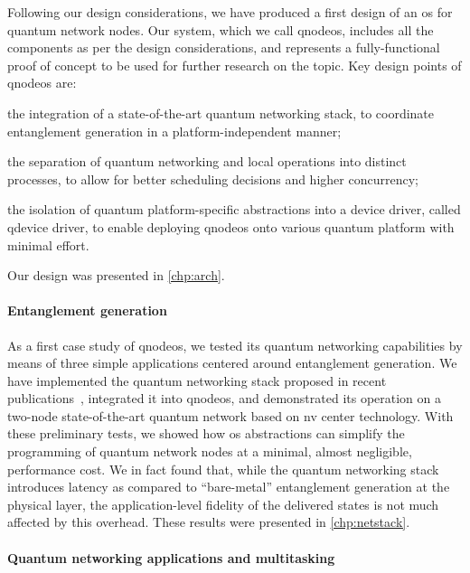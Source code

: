 Following our design considerations, we have produced a first design of an \acrshort{os} for quantum
network nodes. Our system, which we call \acrshort{qnodeos}, includes all the components as per the
design considerations, and represents a fully-functional proof of concept to be used for further
research on the topic. Key design points of \acrshort{qnodeos} are:
\begin{inlinelist}
    \item the integration of a state-of-the-art quantum networking stack, to coordinate entanglement
          generation in a platform-independent manner;
    \item the separation of quantum networking and local operations into distinct processes, to
          allow for better scheduling decisions and higher concurrency;
    \item the isolation of quantum platform-specific abstractions into a device driver, called
          \acrshort{qdevice} driver, to enable deploying \acrshort{qnodeos} onto various quantum
          platform with minimal effort.
\end{inlinelist}
Our design was presented in \cref{chp:arch}.

\paragraph{Entanglement generation}

As a first case study of \acrshort{qnodeos}, we tested its quantum networking capabilities by means
of three simple applications centered around entanglement generation. We have implemented the
quantum networking stack proposed in recent publications~\cite{dahlberg_2019_egp,
kozlowski_2020_qnp}, integrated it into \acrshort{qnodeos}, and demonstrated its operation on a
two-node state-of-the-art quantum network based on \acrshort{nv} center technology. With these
preliminary tests, we showed how \acrshort{os} abstractions can simplify the programming of quantum
network nodes at a minimal, almost negligible, performance cost. We in fact found that, while the
quantum networking stack introduces latency as compared to ``bare-metal'' entanglement generation at
the physical layer, the application-level fidelity of the delivered states is not much affected by
this overhead. These results were presented in \cref{chp:netstack}.

\paragraph{Quantum networking applications and multitasking}

